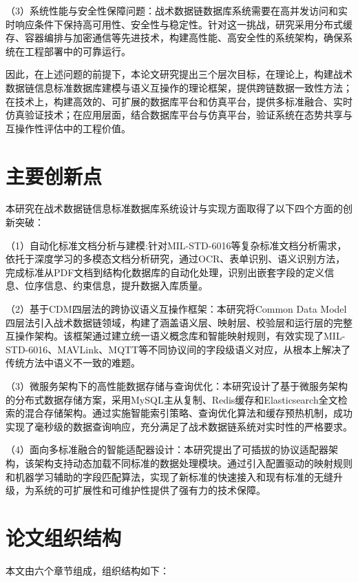 （3）系统性能与安全性保障问题：战术数据链数据库系统需要在高并发访问和实时响应条件下保持高可用性、安全性与稳定性\cite{Waseem2021Design,MonitoringTools2024}。针对这一挑战，研究采用分布式缓存、容器编排与加密通信等先进技术，构建高性能、高安全性的系统架构，确保系统在工程部署中的可靠运行。

因此，在上述问题的前提下，本论文研究提出三个层次目标，在理论上，构建战术数据链信息标准数据库建模与语义互操作的理论框架，提供跨链数据一致性方法；在技术上，构建高效的、可扩展的数据库平台和仿真平台，提供多标准融合、实时仿真验证技术；在应用层面，结合数据库平台与仿真平台，验证系统在态势共享与互操作性评估中的工程价值\cite{SAIC_JRE_Overview_2021,CurtissWright_TCG_HUNTR_2020,DOTE_2022_MIDS_LVT}。

\section{主要创新点}

本研究在战术数据链信息标准数据库系统设计与实现方面取得了以下四个方面的创新突破：

（1）自动化标准文档分析与建模:针对MIL-STD-6016等复杂标准文档分析需求，依托于深度学习的多模态文档分析研究，通过OCR、表单识别、语义识别方法，完成标准从PDF文档到结构化数据库的自动化处理，识别出嵌套字段的定义信息、位序信息、约束信息，提升数据入库质量。

（2）基于CDM四层法的跨协议语义互操作框架：本研究将Common Data Model四层法引入战术数据链领域，构建了涵盖语义层、映射层、校验层和运行层的完整互操作架构。该框架通过建立统一语义概念库和智能映射规则，有效实现了MIL-STD-6016、MAVLink、MQTT等不同协议间的字段级语义对应，从根本上解决了传统方法中语义不一致的难题。

（3）微服务架构下的高性能数据存储与查询优化：本研究设计了基于微服务架构的分布式数据存储方案，采用MySQL主从复制、Redis缓存和Elasticsearch全文检索的混合存储架构。通过实施智能索引策略、查询优化算法和缓存预热机制，成功实现了毫秒级的数据查询响应，充分满足了战术数据链系统对实时性的严格要求。

（4）面向多标准融合的智能适配器设计：本研究提出了可插拔的协议适配器架构，该架构支持动态加载不同标准的数据处理模块。通过引入配置驱动的映射规则和机器学习辅助的字段匹配算法，实现了新标准的快速接入和现有标准的无缝升级，为系统的可扩展性和可维护性提供了强有力的技术保障。

\section{论文组织结构}

本文由六个章节组成，组织结构如下：

